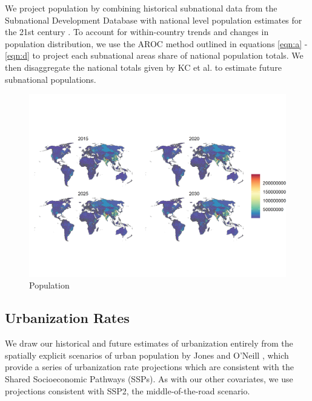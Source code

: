 \documentclass{article}
\begin{document}
We project population by combining historical subnational data from the Subnational Development Database \citep{Smits2019} with national level population estimates for the 21st century \citep{KC2017}.  To account for within-country trends and changes in population distribution, we use the AROC method outlined in equations \ref{eqn:a} - \ref{eqn:d} to project each subnational areas share of national population totals. We then disaggregate the national totals given by KC et al. to estimate future subnational populations.

\begin{figure}[H]
  \centering
  \includegraphics[width=\linewidth]{img/covars/population.png}
  \caption{Population}
\end{figure}

\pagebreak
\subsection{Urbanization Rates}

We draw our historical and future estimates of urbanization entirely from the spatially explicit scenarios of urban population by Jones and O'Neill \citep{Jones2016}, which provide a series of urbanization rate projections which are consistent with the Shared Socioeconomic Pathways (SSPs).  As with our other covariates, we use projections consistent with SSP2, the middle-of-the-road scenario. 
\end{document}
